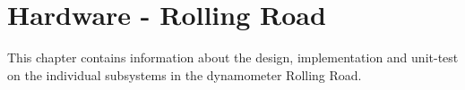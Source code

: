 \chapter{Hardware - Rolling Road}
This chapter contains information about the design, implementation and unit-test on the individual subsystems in the dynamometer Rolling Road.


